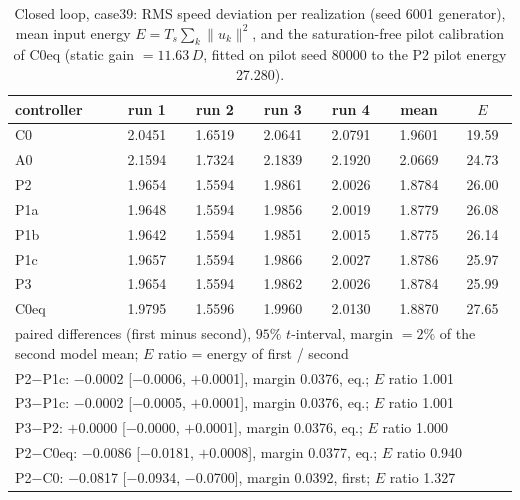 \begin{table}[H]\centering\small\setlength{\tabcolsep}{3pt}
\caption{Closed loop, case39: RMS speed deviation per realization (seed 6001 generator), mean input energy $E=T_s\sum_k\|u_k\|^2$, and the saturation-free pilot calibration of C0eq (static gain $=11.63\,D$, fitted on pilot seed 80000 to the P2 pilot energy 27.280).}
\label{tab:S:cl_case39}
\begin{tabular}{lcccccc}
\toprule
controller & run 1 & run 2 & run 3 & run 4 & mean & $E$\\
\midrule
C0 & 2.0451 & 1.6519 & 2.0641 & 2.0791 & 1.9601 & 19.59\\
A0 & 2.1594 & 1.7324 & 2.1839 & 2.1920 & 2.0669 & 24.73\\
P2 & 1.9654 & 1.5594 & 1.9861 & 2.0026 & 1.8784 & 26.00\\
P1a & 1.9648 & 1.5594 & 1.9856 & 2.0019 & 1.8779 & 26.08\\
P1b & 1.9642 & 1.5594 & 1.9851 & 2.0015 & 1.8775 & 26.14\\
P1c & 1.9657 & 1.5594 & 1.9866 & 2.0027 & 1.8786 & 25.97\\
P3 & 1.9654 & 1.5594 & 1.9862 & 2.0026 & 1.8784 & 25.99\\
C0eq & 1.9795 & 1.5596 & 1.9960 & 2.0130 & 1.8870 & 27.65\\
\midrule
\multicolumn{7}{p{0.9\textwidth}}{paired differences (first minus second), $95\%$ $t$-interval, margin $=2\%$ of the second model mean; $E$ ratio = energy of first / second}\\
\multicolumn{7}{p{0.9\textwidth}}{P2$-$P1c: $-$0.0002 [$-$0.0006, $+$0.0001], margin 0.0376, eq.; $E$ ratio 1.001}\\
\multicolumn{7}{p{0.9\textwidth}}{P3$-$P1c: $-$0.0002 [$-$0.0005, $+$0.0001], margin 0.0376, eq.; $E$ ratio 1.001}\\
\multicolumn{7}{p{0.9\textwidth}}{P3$-$P2: $+$0.0000 [$-$0.0000, $+$0.0001], margin 0.0376, eq.; $E$ ratio 1.000}\\
\multicolumn{7}{p{0.9\textwidth}}{P2$-$C0eq: $-$0.0086 [$-$0.0181, $+$0.0008], margin 0.0377, eq.; $E$ ratio 0.940}\\
\multicolumn{7}{p{0.9\textwidth}}{P2$-$C0: $-$0.0817 [$-$0.0934, $-$0.0700], margin 0.0392, first; $E$ ratio 1.327}\\
\bottomrule
\end{tabular}
\end{table}

